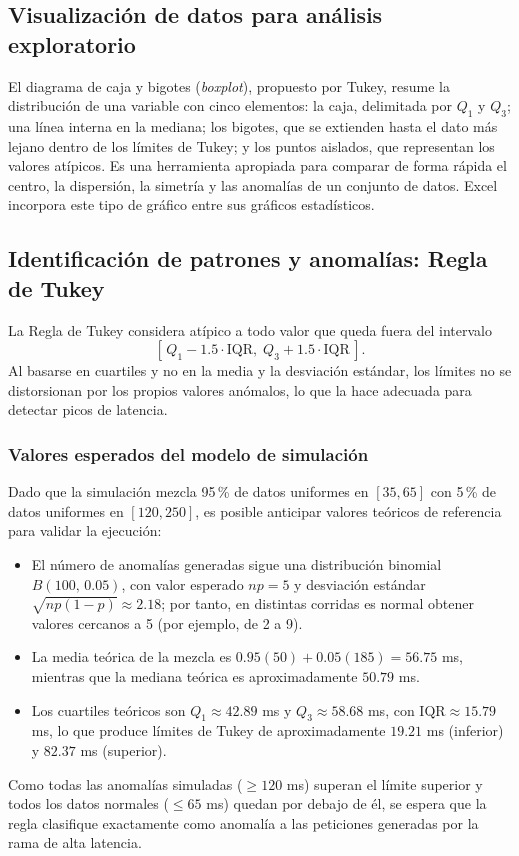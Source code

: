 \documentclass[12pt,letterpaper]{article}
\begin{document}
\subsection{Visualización de datos para análisis exploratorio}
El diagrama de caja y bigotes (\textit{boxplot}), propuesto por Tukey, resume la distribución de una variable con cinco elementos: la caja, delimitada por $Q_1$ y $Q_3$; una línea interna en la mediana; los bigotes, que se extienden hasta el dato más lejano dentro de los límites de Tukey; y los puntos aislados, que representan los valores atípicos. \cite{tukey-1977} Es una herramienta apropiada para comparar de forma rápida el centro, la dispersión, la simetría y las anomalías de un conjunto de datos. Excel incorpora este tipo de gráfico entre sus gráficos estadísticos. \cite{microsoft-boxwhisker}
 
\subsection{Identificación de patrones y anomalías: Regla de Tukey}
La Regla de Tukey considera atípico a todo valor que queda fuera del intervalo
\begin{equation}
    \left[\,Q_1 - 1.5\cdot\mathrm{IQR},\; Q_3 + 1.5\cdot\mathrm{IQR}\,\right].
\end{equation}
Al basarse en cuartiles y no en la media y la desviación estándar, los límites no se distorsionan por los propios valores anómalos, lo que la hace adecuada para detectar picos de latencia. \cite{tukey-1977}
 
\subsubsection{Valores esperados del modelo de simulación}
Dado que la simulación mezcla 95\,\% de datos uniformes en $[35,65]$ con 5\,\% de datos uniformes en $[120,250]$, es posible anticipar valores teóricos de referencia para validar la ejecución:
\begin{itemize}
    \item El número de anomalías generadas sigue una distribución binomial $B(100,\,0.05)$, con valor esperado $np=5$ y desviación estándar $\sqrt{np(1-p)}\approx 2.18$; por tanto, en distintas corridas es normal obtener valores cercanos a 5 (por ejemplo, de 2 a 9).
    \item La media teórica de la mezcla es $0.95(50)+0.05(185)=56.75$ ms, mientras que la mediana teórica es aproximadamente $50.79$ ms.
    \item Los cuartiles teóricos son $Q_1\approx 42.89$ ms y $Q_3\approx 58.68$ ms, con $\mathrm{IQR}\approx 15.79$ ms, lo que produce límites de Tukey de aproximadamente $19.21$ ms (inferior) y $82.37$ ms (superior).
\end{itemize}
Como todas las anomalías simuladas ($\geq 120$ ms) superan el límite superior y todos los datos normales ($\leq 65$ ms) quedan por debajo de él, se espera que la regla clasifique exactamente como anomalía a las peticiones generadas por la rama de alta latencia.
 
\end{document}
